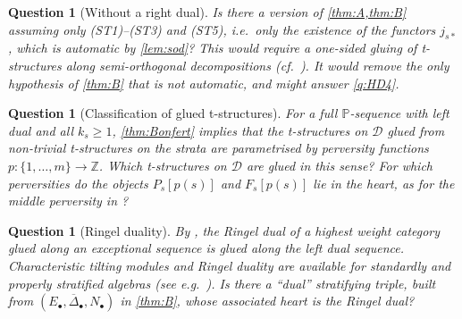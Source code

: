 \documentclass[11pt,reqno]{amsart}
\theoremstyle{plain}
\newtheorem{question}[theorem]{Question}
\theoremstyle{definition}
\theoremstyle{remark}
\newcommand{\Deltabar}{\overline{\Delta}}
\newcommand{\cD}{\mathcal{D}}
\begin{document}
\begin{question}[Without a right dual]
Is there a version of \cref{thm:A,thm:B} assuming only (ST1)--(ST3) and (ST5), i.e.\ only the existence of the functors $j_{s*}$, which is automatic by \cref{lem:sod}? This would require a one-sided gluing of t-structures along semi-orthogonal decompositions (cf.\ \cite{CP10}). It would remove the only hypothesis of \cref{thm:B} that is not automatic, and might answer \cref{q:HD4}.
\end{question}

\begin{question}[Classification of glued t-structures]\label{q:classification}
For a full $\mathbb{P}$-sequence with left dual and all $k_s\ge1$, \cref{thm:Bonfert} implies that the t-structures on $\cD$ glued from non-trivial t-structures on the strata are parametrised by perversity functions $p\colon\{1,\dots,m\}\to\mathbb{Z}$. Which t-structures on $\cD$ are glued in this sense? For which perversities do the objects $P_s[p(s)]$ and $F_s[p(s)]$ lie in the heart, as for the middle perversity in \cite[\S5.1]{BB26}?
\end{question}

\begin{question}[Ringel duality]
By \cite[Thm.~3.2]{BB26}, the Ringel dual of a highest weight category glued along an exceptional sequence is glued along the left dual sequence. Characteristic tilting modules and Ringel duality are available for standardly and properly stratified algebras (see e.g.\ \cite{AHLU00}). Is there a ``dual'' stratifying triple, built from $(E_\bullet,\Deltabar_\bullet,N_\bullet)$ in \cref{thm:B}, whose associated heart is the Ringel dual?
\end{question}
\end{document}
